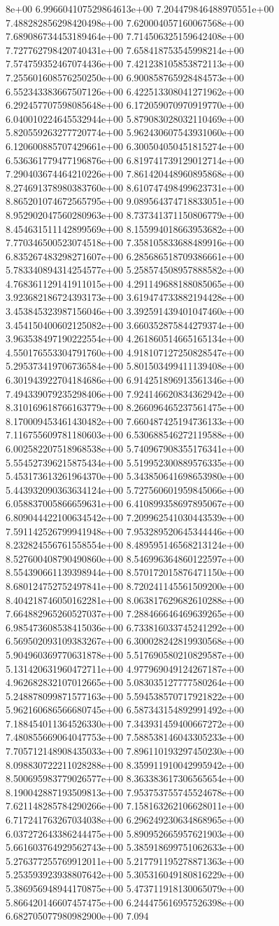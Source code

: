 8e+00	6.996604107529864613e+00	7.204479846488970551e+00	7.488282856298420498e+00	7.620004057160067568e+00	7.689086734453189464e+00	7.714506325159642408e+00	7.727762798420740431e+00	7.658418753545998214e+00	7.574759352467074436e+00	7.421238105853872113e+00	7.255601608576250250e+00	6.900858765928484573e+00	6.552343383667507126e+00	6.422513308041271962e+00	6.292457707598085648e+00	6.172059070970919770e+00	6.040010224645532944e+00	5.879083028032110469e+00	5.820559263277720774e+00	5.962430607543931060e+00	6.120600885707429661e+00	6.300504050451815274e+00	6.536361779477196876e+00	6.819741739129012714e+00	7.290403674464210226e+00	7.861420448960895868e+00	8.274691378980383760e+00	8.610747498499623731e+00	8.865201074672565795e+00	9.089564374718833051e+00	8.952902047560280963e+00	8.737341371150806779e+00	8.454631511142899569e+00	8.155994018663953682e+00	7.770346500523074518e+00	7.358105833688489916e+00	6.835267483298271607e+00	6.285686518709386661e+00	5.783340894314254577e+00	5.258574508957888582e+00	4.768361129141911015e+00	4.291149688188085065e+00	3.923682186724393173e+00	3.619474733882194428e+00	3.453845323987156046e+00	3.392591439401047460e+00	3.454150400602125082e+00	3.660352875844279374e+00	3.963538497190222554e+00	4.261860514665165134e+00	4.550176553304791760e+00	4.918107127250828547e+00	5.295373419706736584e+00	5.801503499411139408e+00	6.301943922704184686e+00	6.914251896913561346e+00	7.494339079235298406e+00	7.924146620834362942e+00	8.310169618766163779e+00	8.266096465237561475e+00	8.170009453461430482e+00	7.660487425194736133e+00	7.116755609781180603e+00	6.530688546272119588e+00	6.002582207518968538e+00	5.740967908355176341e+00	5.554527396215875434e+00	5.519952300889576335e+00	5.453173613261964370e+00	5.343850641698653980e+00	5.443932090363634124e+00	5.727560601959845066e+00	6.058837005866659631e+00	6.410899358697895067e+00	6.809044422100634542e+00	7.209962541030443539e+00	7.591142526799941948e+00	7.953289520645344446e+00	8.232824556761558554e+00	8.489595146568213124e+00	8.527600408790490860e+00	8.546996364860122597e+00	8.554390661139398944e+00	8.570172015876471150e+00	8.680124752752497841e+00	8.720241145561509200e+00	8.404218746050162281e+00	8.063817629682610288e+00	7.664882965260527037e+00	7.288466646469639265e+00	6.985473608538415036e+00	6.733816033745241292e+00	6.569502093109383267e+00	6.300028242819930568e+00	5.904960369770631878e+00	5.517690580210829587e+00	5.131420631960472711e+00	4.977969049124267187e+00	4.962682832107012665e+00	5.083035127777580264e+00	5.248878099871577163e+00	5.594538570717921822e+00	5.962160686566680745e+00	6.587343154892991492e+00	7.188454011364526330e+00	7.343931459400667272e+00	7.480855669064047753e+00	7.588538146043305233e+00	7.705712148908435033e+00	7.896110193297450230e+00	8.098830722211028288e+00	8.359911910042995942e+00	8.500695983779026577e+00	8.363383617306565654e+00	8.190042887193509813e+00	7.953753755745524678e+00	7.621148285784290266e+00	7.158163262106628011e+00	6.717241763267034038e+00	6.296249230634868965e+00	6.037272643386244475e+00	5.890952665957621903e+00	5.661603764929562743e+00	5.385918699751062633e+00	5.276377255769912011e+00	5.217791195278871363e+00	5.253593923938807642e+00	5.305316049180816229e+00	5.386956948944170875e+00	5.473711918130065079e+00	5.866420146607457475e+00	6.244475616957526398e+00	6.682705077980982900e+00	7.094